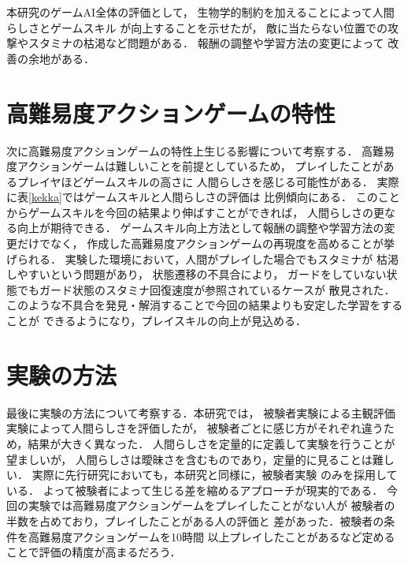 \documentclass[a4paper,12pt,oneside,openany,titlepage]{jreport}
\begin{document}
本研究のゲームAI全体の評価として，
生物学的制約を加えることによって人間らしさとゲームスキル
が向上することを示せたが，
敵に当たらない位置での攻撃やスタミナの枯渇など問題がある．
報酬の調整や学習方法の変更によって
改善の余地がある．


\section{高難易度アクションゲームの特性}
次に高難易度アクションゲームの特性上生じる影響について考察する．
高難易度アクションゲームは難しいことを前提としているため，
プレイしたことがあるプレイヤほどゲームスキルの高さに
人間らしさを感じる可能性がある．
実際に表\ref{kekka}ではゲームスキルと人間らしさの評価は
比例傾向にある．
このことからゲームスキルを今回の結果より伸ばすことができれば，
人間らしさの更なる向上が期待できる．
ゲームスキル向上方法として報酬の調整や学習方法の変更だけでなく，
作成した高難易度アクションゲームの再現度を高めることが挙げられる．
実験した環境において，人間がプレイした場合でもスタミナが
枯渇しやすいという問題があり，
状態遷移の不具合により，
ガードをしていない状態でもガード状態のスタミナ回復速度が参照されているケースが
散見された．
このような不具合を発見・解消することで今回の結果よりも安定した学習をすることが
できるようになり，プレイスキルの向上が見込める．





\section{実験の方法}
最後に実験の方法について考察する．本研究では，
被験者実験による主観評価実験によって人間らしさを評価したが，
被験者ごとに感じ方がそれぞれ違うため，結果が大きく異なった．
人間らしさを定量的に定義して実験を行うことが望ましいが，
人間らしさは曖昧さを含むものであり，定量的に見ることは難しい．
実際に先行研究においても，本研究と同様に，被験者実験
のみを採用している．
よって被験者によって生じる差を縮めるアプローチが現実的である．
今回の実験では高難易度アクションゲームをプレイしたことがない人が
被験者の半数を占めており，プレイしたことがある人の評価と
差があった．被験者の条件を高難易度アクションゲームを10時間
以上プレイしたことがあるなど定めることで評価の精度が高まるだろう．
\end{document}
